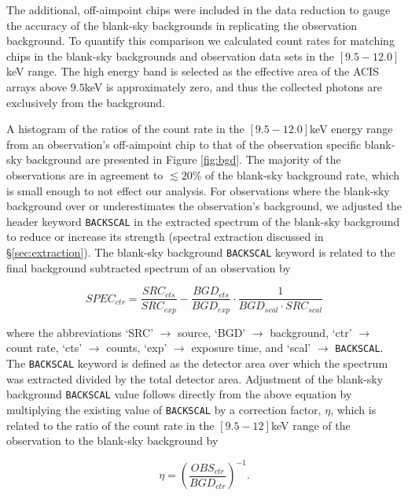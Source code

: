 \documentclass[12pt, preprint]{aastex}
\begin{document}
The additional, off-aimpoint chips were included in the data reduction
to gauge the accuracy of the blank-sky backgrounds in replicating
the observation background. To quantify this comparison we calculated
count rates for matching chips in the blank-sky
backgrounds and observation data sets in the $[9.5-12.0]$keV
range. The high energy band is selected as the effective area of the
ACIS arrays above $9.5$keV is approximately zero, and
thus the collected photons are exclusively from the background.

A histogram of the ratios of the count rate in the $[9.5-12.0]$keV energy range from an
observation's off-aimpoint chip to that of the observation specific
blank-sky background are presented in Figure \ref{fig:bgd}. The majority of the
observations are in agreement to $\lesssim 20\%$ of the blank-sky background
rate, which is small enough to not effect our analysis. For
observations where the blank-sky background over or underestimates the observation's
background, we adjusted the header keyword
{\tt BACKSCAL} in the extracted spectrum of the blank-sky background to
reduce or increase its strength (spectral extraction discussed in \S\ref{sec:extraction}). The
blank-sky background {\tt BACKSCAL} keyword is related to the final
background subtracted spectrum of an observation by

\begin{equation}
SPEC_{ctr} = \frac{SRC_{cts}}{SRC_{exp}} -
\frac{BGD_{cts}}{BGD_{exp}} \cdot \frac{1}{BGD_{scal} \cdot
SRC_{scal}}
\end{equation}

where the abbreviations `SRC' $\rightarrow$ source, `BGD' $\rightarrow$
background, `ctr' $\rightarrow$ count rate, `cts' $\rightarrow$
counts, `exp' $\rightarrow$ exposure time, and `scal' $\rightarrow$
{\tt BACKSCAL}. The {\tt BACKSCAL} keyword is defined as the detector area over
which the spectrum was extracted divided by the total detector
area. Adjustment of the blank-sky background {\tt BACKSCAL} value
follows directly from the above equation by multiplying the existing
value of {\tt BACKSCAL} by a correction factor, $\eta$, which is
related to the ratio of the count rate in the $[9.5-12]$keV range of
the observation to the blank-sky background by

\begin{equation}
\eta = (\frac{OBS_{ctr}}{BGD_{ctr}})^{-1}.
\end{equation}
\end{document}
